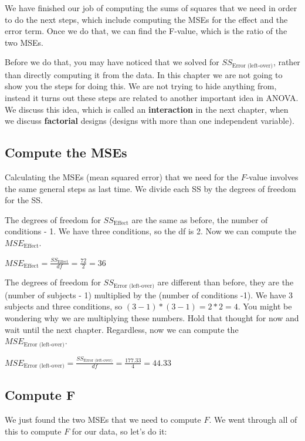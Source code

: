 \documentclass[
]{book}
\begin{document}
We have finished our job of computing the sums of squares that we need in order to do the next steps, which include computing the MSEs for the effect and the error term. Once we do that, we can find the F-value, which is the ratio of the two MSEs.

Before we do that, you may have noticed that we solved for \(SS_\text{Error (left-over)}\), rather than directly computing it from the data. In this chapter we are not going to show you the steps for doing this. We are not trying to hide anything from, instead it turns out these steps are related to another important idea in ANOVA. We discuss this idea, which is called an \textbf{interaction} in the next chapter, when we discuss \textbf{factorial} designs (designs with more than one independent variable).

\hypertarget{compute-the-mses}{%
\subsection{Compute the MSEs}\label{compute-the-mses}}

Calculating the MSEs (mean squared error) that we need for the \(F\)-value involves the same general steps as last time. We divide each SS by the degrees of freedom for the SS.

The degrees of freedom for \(SS_\text{Effect}\) are the same as before, the number of conditions - 1. We have three conditions, so the df is 2. Now we can compute the \(MSE_\text{Effect}\).

\(MSE_\text{Effect} = \frac{SS_\text{Effect}}{df} = \frac{72}{2} = 36\)

The degrees of freedom for \(SS_\text{Error (left-over)}\) are different than before, they are the (number of subjects - 1) multiplied by the (number of conditions -1). We have 3 subjects and three conditions, so \((3-1) * (3-1) = 2*2 =4\). You might be wondering why we are multiplying these numbers. Hold that thought for now and wait until the next chapter. Regardless, now we can compute the \(MSE_\text{Error (left-over)}\).

\(MSE_\text{Error (left-over)} = \frac{SS_\text{Error (left-over)}}{df} = \frac{177.33}{4}= 44.33\)

\hypertarget{compute-f}{%
\subsection{Compute F}\label{compute-f}}

We just found the two MSEs that we need to compute \(F\). We went through all of this to compute \(F\) for our data, so let's do it:
\end{document}
